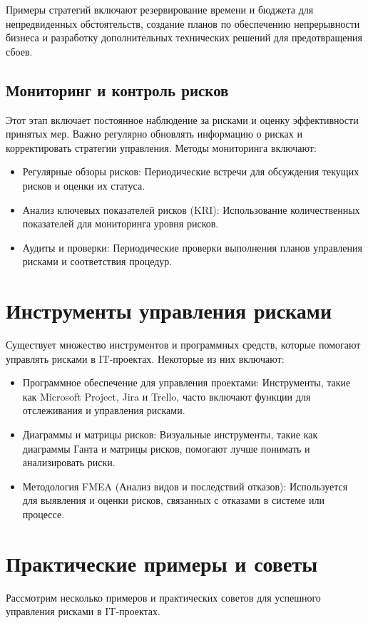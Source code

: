     Примеры стратегий включают резервирование времени и бюджета для непредвиденных обстоятельств, создание планов по обеспечению непрерывности бизнеса и разработку дополнительных технических решений для предотвращения сбоев.

    \subsection*{Мониторинг и контроль рисков}
    Этот этап включает постоянное наблюдение за рисками и оценку эффективности принятых мер. Важно регулярно обновлять информацию о рисках и корректировать стратегии управления. Методы мониторинга включают:

    \begin{itemize}
        \item Регулярные обзоры рисков: Периодические встречи для обсуждения текущих рисков и оценки их статуса.
        \item Анализ ключевых показателей рисков (KRI): Использование количественных показателей для мониторинга уровня рисков.
        \item Аудиты и проверки: Периодические проверки выполнения планов управления рисками и соответствия процедур.
    \end{itemize}

    \section{Инструменты управления рисками}
    Существует множество инструментов и программных средств, которые помогают управлять рисками в IT-проектах. Некоторые из них включают:

    \begin{itemize}
        \item Программное обеспечение для управления проектами: Инструменты, такие как Microsoft Project, Jira и Trello, часто включают функции для отслеживания и управления рисками.
        \item Диаграммы и матрицы рисков: Визуальные инструменты, такие как диаграммы Ганта и матрицы рисков, помогают лучше понимать и анализировать риски.
        \item Методология FMEA (Анализ видов и последствий отказов): Используется для выявления и оценки рисков, связанных с отказами в системе или процессе.
    \end{itemize}

    \section{Практические примеры и советы}
    Рассмотрим несколько примеров и практических советов для успешного управления рисками в IT-проектах.

